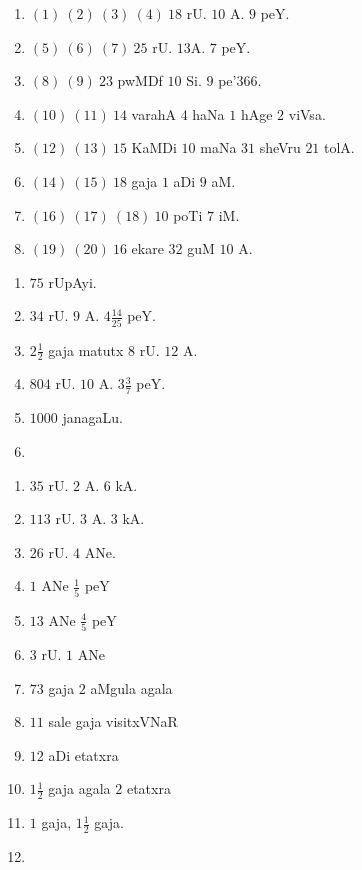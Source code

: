 
\begin{enumerate}
\item[] $(1)~ (2)~ (3)~(4)~18$ rU. $10$ A. $9$ peY.

\item[] $(5)~ (6)~ (7)~ 25$ rU. $13$A. $7$ peY.

\item[] $(8)~ (9)~ 23$ pwMDf $10$ Si. $9$ pe\char'366.

\item[] $(10)~ (11)~ 14$ varahA $4$ haNa $1$ hAge $2$ viVsa.

\item[] $(12)~ (13)~ 15$ KaMDi $10$ maNa $31$ sheVru $21$ tolA.

\item[] $(14)~ (15)~ 18$ gaja $1$ aDi $9$ aM.

\item[] $(16)~ (17)~ (18)~ 10$ poTi $7$ iM.

\item[] $(19)~ (20)~ 16$ ekare $32$ guM $10$ A.
\end{enumerate}



\begin{multicols}{2}
\begin{enumerate}[$(1)$]
\item $75$ rUpAyi.
\item $34$ rU. $9$ A. $4 \frac{14}{25}$ peY.
\item $2\frac{1}{2}$ gaja matutx $8$ rU. $12$ A.
\item $804$ rU. $10$ A. $3 \frac{3}{7}$ peY.
\item $1000$ janagaLu.
\item[]
\end{enumerate}
\end{multicols}


\begin{multicols}{3}
\begin{enumerate}[$(1)$]
\item $35$ rU. $2$ A. $6$ kA. 
\item $113$ rU. $3$ A. $3$ kA.
\item $26$ rU. $4$ ANe. 
\item $1$ ANe $\frac{1}{5}$ peY
\item $13$ ANe $\frac{4}{5}$ peY 
\item $3$ rU. $1$ ANe
\item $73$ gaja $2$ aMgula agala
\item $11$ sale gaja visitxVNaR
\item $12$ aDi etatxra 
\item $1 \frac{1}{2}$ gaja agala $2$ etatxra
\item $1$ gaja, $1 \frac{1}{2}$ gaja.
\item[]
\end{enumerate}
\end{multicols}

